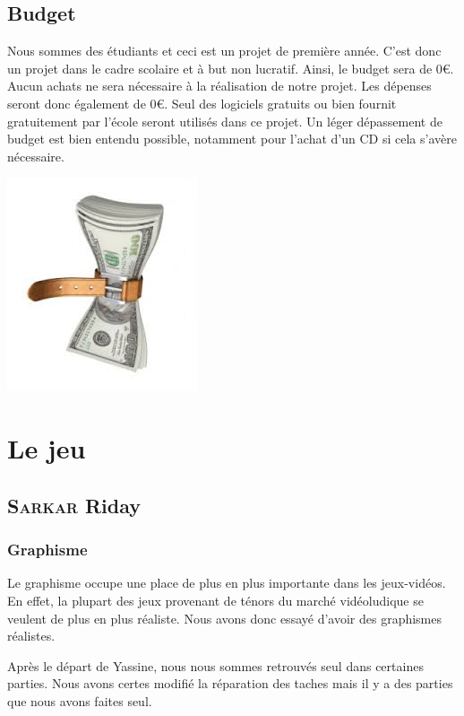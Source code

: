 \documentclass[a4paper, 12pt]{article}
\begin{document}
\subsection{Budget}

Nous sommes des étudiants et ceci est un projet de première année. C'est donc un projet dans le cadre scolaire et à but non lucratif. Ainsi, le budget sera de 0\euro{}. Aucun achats ne sera nécessaire à la réalisation de notre projet. Les dépenses seront donc également de 0\euro{}. Seul des logiciels gratuits ou bien fournit gratuitement par l'école seront utilisés dans ce projet. Un léger dépassement de budget est bien entendu possible, notamment pour l'achat d'un CD si cela s'avère nécessaire.\\
\centerline{\includegraphics[scale=0.7]{images.jpg}}
\section{Le jeu}
	\subsection{\textsc{Sarkar} Riday}
	
	\subsubsection{Graphisme}
Le graphisme occupe une place de plus en plus importante dans les jeux-vidéos. En effet, la plupart des jeux provenant de ténors du marché vidéoludique se veulent de plus en plus réaliste. Nous avons donc essayé d’avoir des graphismes réalistes.   
\par Après le départ de Yassine, nous nous sommes retrouvés seul dans certaines parties. Nous avons certes modifié la réparation des taches mais il y a des parties que nous avons faites seul.
\end{document}
